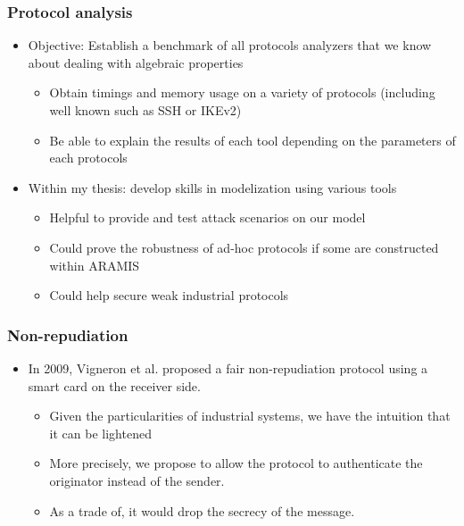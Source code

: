 \documentclass{beamer}
\begin{document}
\begin{frame}
    \frametitle{Protocol analysis}

    \begin{itemize}
        \item Objective: Establish a benchmark of all protocols analyzers that we know about dealing with algebraic properties
        \begin{itemize}
            \item Obtain timings and memory usage on a variety of protocols (including well known such as SSH or IKEv2)
            \item Be able to explain the results of each tool depending on the parameters of each protocols %
        \end{itemize}
            \vfill
        \item Within my thesis: develop skills in modelization using various tools
        \begin{itemize}
            \item Helpful to provide and test attack scenarios on our model
            \item Could prove the robustness of ad-hoc protocols if some are constructed within ARAMIS
            \item Could help secure weak industrial protocols
        \end{itemize}
    \end{itemize}
\end{frame}

\begin{frame}
    \frametitle{Non-repudiation}
    
    \begin{itemize}
        \item In 2009, Vigneron et al. proposed a fair non-repudiation protocol using a smart card on the receiver side.
            \vfill
        \begin{itemize}
            \item Given the particularities of industrial systems, we have the intuition that it can be lightened
                \vfill
            \item More precisely, we propose to allow the protocol to authenticate the originator instead of the sender.
                \vfill
            \item As a trade of, it would drop the secrecy of the message.
        \end{itemize}
    \end{itemize}
\end{frame}
\end{document}
